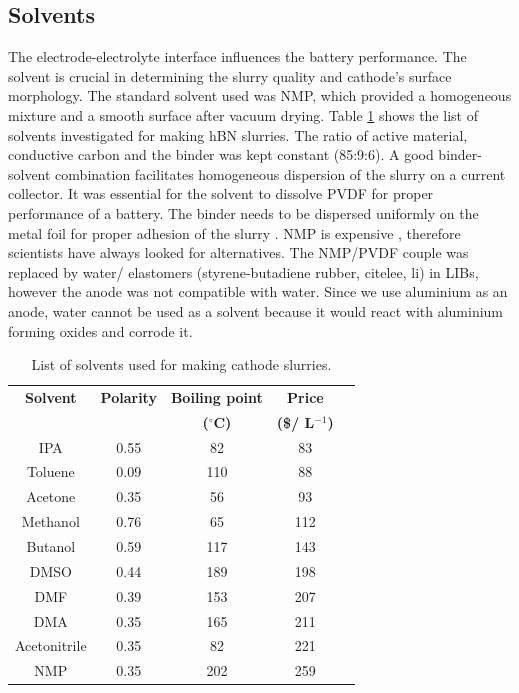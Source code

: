 \subsection*{Solvents}
The electrode-electrolyte interface influences the battery performance. The solvent is crucial in determining the slurry quality and cathode's surface morphology. The standard solvent used was NMP, which provided a homogeneous mixture and a smooth surface after vacuum drying. Table \ref{t1} shows the list of solvents investigated for making hBN slurries. The ratio of active material, conductive carbon and the binder was kept constant (85:9:6). A good binder-solvent combination facilitates homogeneous dispersion of the slurry on a current collector. It was essential for the solvent to dissolve PVDF for proper performance of a battery. The binder needs to be dispersed uniformly on the metal foil for proper adhesion of the slurry \cite{lee, stein}. 
NMP is expensive , therefore scientists have always looked for alternatives. The NMP/PVDF couple was replaced by water/ elastomers (styrene-butadiene rubber, cite{lee, li}) in LIBs, however the anode was not compatible with water. Since we use aluminium as an anode, water cannot be used as a solvent because it would react with aluminium forming oxides and corrode it.
\begin{table}
\caption{List of solvents used for making cathode slurries.} \label{t1}
\begin{center}
 \begin{tabular}{|ccccc|} 
 \hline
 \textbf{Solvent} & \textbf{Polarity} & \textbf{Boiling point} & \textbf{Price}\\
 \textbf{} & \textbf{} & \textbf{($^{\circ}$C)} & \textbf{(\$/ L$^{-1}$)}\\
 \hline
 \hline
IPA & 0.55 & 82 & 83 \\
Toluene & 0.09 & 110 & 88 \\
Acetone & 0.35 & 56 & 93 \\
Methanol & 0.76 & 65 & 112 \\ 
Butanol & 0.59 & 117 & 143 \\
DMSO & 0.44 & 189 & 198 \\
DMF & 0.39 & 153 & 207 \\
DMA & 0.35 & 165 & 211 \\
Acetonitrile & 0.35 & 82 & 221 \\
NMP & 0.35 & 202 & 259 \\
 \hline
\end{tabular}
\end{center}
\end{table}
